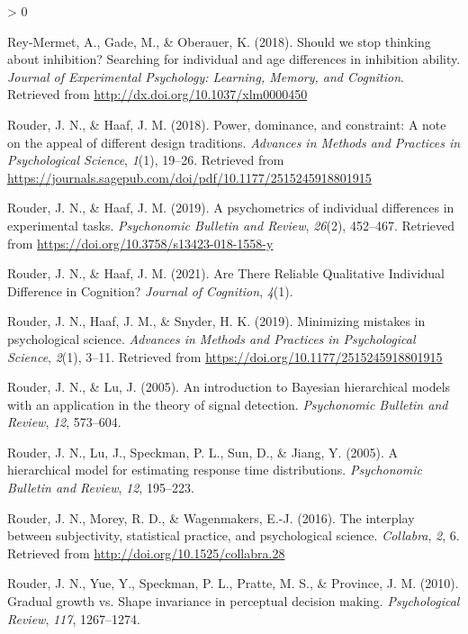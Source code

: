 \documentclass[
  english,
  ,man]{apa6}
\newlength{\cslhangindent}
\newenvironment{CSLReferences}[2] %
 {%
  \setlength{\parindent}{0pt}
  \ifodd #1 \everypar{\setlength{\hangindent}{\cslhangindent}}\ignorespaces\fi
  \ifnum #2 > 0
  \setlength{\parskip}{#2\baselineskip}
  \fi
 }%
 {}
\begin{document}
\begin{CSLReferences}{1}{0}
\leavevmode\hypertarget{ref-ReyMermet:etal:2018}{}%
Rey-Mermet, A., Gade, M., \& Oberauer, K. (2018). Should we stop thinking about inhibition? Searching for individual and age differences in inhibition ability. \emph{Journal of Experimental Psychology: Learning, Memory, and Cognition}. Retrieved from \url{http://dx.doi.org/10.1037/xlm0000450}

\leavevmode\hypertarget{ref-Rouder:Haaf:2018b}{}%
Rouder, J. N., \& Haaf, J. M. (2018). Power, dominance, and constraint: A note on the appeal of different design traditions. \emph{Advances in Methods and Practices in Psychological Science}, \emph{1}(1), 19--26. Retrieved from \url{https://journals.sagepub.com/doi/pdf/10.1177/2515245918801915}

\leavevmode\hypertarget{ref-Rouder:Haaf:2019a}{}%
Rouder, J. N., \& Haaf, J. M. (2019). A psychometrics of individual differences in experimental tasks. \emph{Psychonomic Bulletin and Review}, \emph{26}(2), 452--467. Retrieved from \url{https://doi.org/10.3758/s13423-018-1558-y}

\leavevmode\hypertarget{ref-Rouder.Haaf.2021}{}%
Rouder, J. N., \& Haaf, J. M. (2021). Are {There Reliable Qualitative Individual Difference} in {Cognition}? \emph{Journal of Cognition}, \emph{4}(1).

\leavevmode\hypertarget{ref-Rouder:etal:2019a}{}%
Rouder, J. N., Haaf, J. M., \& Snyder, H. K. (2019). Minimizing mistakes in psychological science. \emph{Advances in Methods and Practices in Psychological Science}, \emph{2}(1), 3--11. Retrieved from \url{https://doi.org/10.1177/2515245918801915}

\leavevmode\hypertarget{ref-Rouder:Lu:2005}{}%
Rouder, J. N., \& Lu, J. (2005). An introduction to {B}ayesian hierarchical models with an application in the theory of signal detection. \emph{Psychonomic Bulletin and Review}, \emph{12}, 573--604.

\leavevmode\hypertarget{ref-Rouder:etal:2005a}{}%
Rouder, J. N., Lu, J., Speckman, P. L., Sun, D., \& Jiang, Y. (2005). A hierarchical model for estimating response time distributions. \emph{Psychonomic Bulletin and Review}, \emph{12}, 195--223.

\leavevmode\hypertarget{ref-Rouder:etal:2016b}{}%
Rouder, J. N., Morey, R. D., \& Wagenmakers, E.-J. (2016). The interplay between subjectivity, statistical practice, and psychological science. \emph{Collabra}, \emph{2}, 6. Retrieved from \url{http://doi.org/10.1525/collabra.28}

\leavevmode\hypertarget{ref-Rouder:etal:2010d}{}%
Rouder, J. N., Yue, Y., Speckman, P. L., Pratte, M. S., \& Province, J. M. (2010). Gradual growth vs. Shape invariance in perceptual decision making. \emph{Psychological Review}, \emph{117}, 1267--1274.


\end{CSLReferences}
\end{document}
